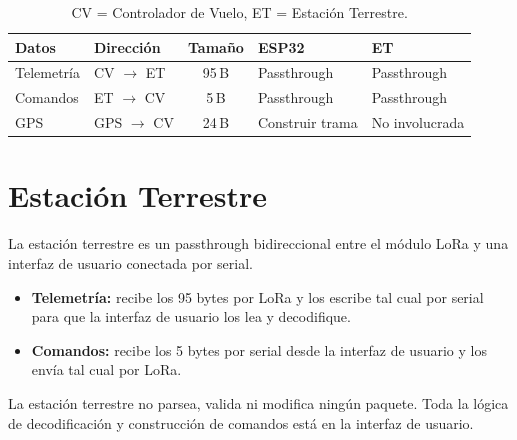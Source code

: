 \documentclass[11pt,a4paper]{article}
\begin{document}
\begin{table}[h]
\centering
\begin{tabular}{@{}llcll@{}}
\toprule
\textbf{Datos} & \textbf{Dirección} & \textbf{Tamaño} & \textbf{ESP32} & \textbf{ET} \\
\midrule
Telemetría & CV $\rightarrow$ ET & 95\,B & Passthrough & Passthrough \\
Comandos   & ET $\rightarrow$ CV & 5\,B  & Passthrough & Passthrough \\
GPS        & GPS $\rightarrow$ CV & 24\,B & Construir trama & No involucrada \\
\bottomrule
\end{tabular}
\caption{CV = Controlador de Vuelo, ET = Estación Terrestre.}
\end{table}

\section{Estación Terrestre}

La estación terrestre es un passthrough bidireccional entre el módulo LoRa y una interfaz de usuario conectada por serial.

\begin{itemize}
    \item \textbf{Telemetría:} recibe los 95 bytes por LoRa y los escribe tal cual por serial para que la interfaz de usuario los lea y decodifique.
    \item \textbf{Comandos:} recibe los 5 bytes por serial desde la interfaz de usuario y los envía tal cual por LoRa.
\end{itemize}

La estación terrestre no parsea, valida ni modifica ningún paquete. Toda la lógica de decodificación y construcción de comandos está en la interfaz de usuario.
\end{document}
